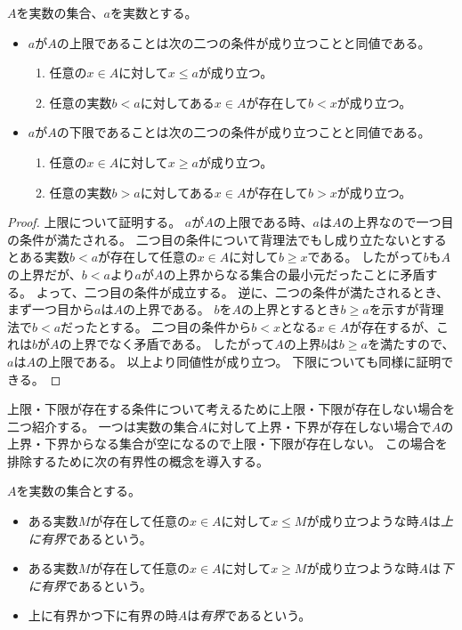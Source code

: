 \begin{proposition}
$A$を実数の集合、$a$を実数とする。
\begin{itemize}
\item
$a$が$A$の上限であることは次の二つの条件が成り立つことと同値である。
\begin{enumerate}
\item
任意の$x \in A$に対して$x \le a$が成り立つ。
\item
任意の実数$b < a$に対してある$x \in A$が存在して$b < x$が成り立つ。
\end{enumerate}
\item
$a$が$A$の下限であることは次の二つの条件が成り立つことと同値である。
\begin{enumerate}
\item
任意の$x \in A$に対して$x \ge a$が成り立つ。
\item
任意の実数$b > a$に対してある$x \in A$が存在して$b > x$が成り立つ。
\end{enumerate}
\end{itemize}
\end{proposition}

\begin{proof}
上限について証明する。
$a$が$A$の上限である時、$a$は$A$の上界なので一つ目の条件が満たされる。
二つ目の条件について背理法でもし成り立たないとするとある実数$b < a$が存在して任意の$x \in A$に対して$b \ge x$である。
したがって$b$も$A$の上界だが、$b < a$より$a$が$A$の上界からなる集合の最小元だったことに矛盾する。
よって、二つ目の条件が成立する。
逆に、二つの条件が満たされるとき、まず一つ目から$a$は$A$の上界である。
$b$を$A$の上界とするとき$b \ge a$を示すが背理法で$b < a$だったとする。
二つ目の条件から$b < x$となる$x \in A$が存在するが、これは$b$が$A$の上界でなく矛盾である。
したがって$A$の上界$b$は$b \ge a$を満たすので、$a$は$A$の上限である。
以上より同値性が成り立つ。
下限についても同様に証明できる。
\end{proof}

上限・下限が存在する条件について考えるために上限・下限が存在しない場合を二つ紹介する。
一つは実数の集合$A$に対して上界・下界が存在しない場合で$A$の上界・下界からなる集合が空になるので上限・下限が存在しない。
この場合を排除するために次の有界性の概念を導入する。

\begin{definition}[集合の有界性]
\label{d_bdd}
$A$を実数の集合とする。
\begin{itemize}
\item
ある実数$M$が存在して任意の$x \in A$に対して$x \le M$が成り立つような時$A$は\emph{上に有界}であるという。
\item
ある実数$M$が存在して任意の$x \in A$に対して$x \ge M$が成り立つような時$A$は\emph{下に有界}であるという。
\item
上に有界かつ下に有界の時$A$は\emph{有界}であるという。
\end{itemize}
\end{definition}

